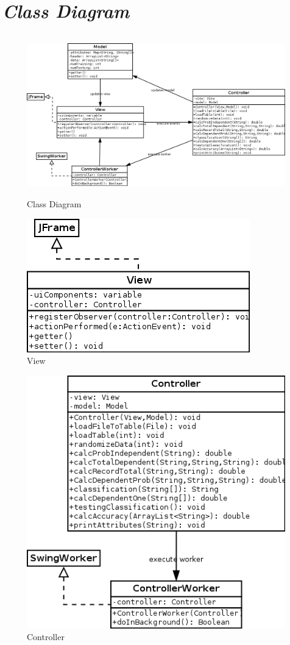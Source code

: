 \documentclass[11pt,a4paper]{report}
\begin{document}
	\section{\textit{Class Diagram}}
	\begin{figure}[h]
	\centering
	\includegraphics[width=13cm, height=7cm]{class}
	\caption{Class Diagram}
	\label{fig:class}
	\end{figure}
	
	\begin{figure}[h]
	\centering
	\includegraphics[width=0.5\linewidth]{view}
	\caption{View}
	\label{fig:view}
	\end{figure}
	\newpage
	\begin{figure}[h]
	\centering
	\includegraphics[width=0.7\linewidth]{controller}
	\caption{Controller}
	\label{fig:controller}
	\end{figure}
	
\end{document}
